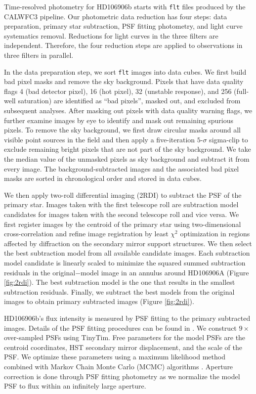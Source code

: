 \documentclass[twocolumn]{aastex62}
\begin{document}
Time-resolved photometry for HD106906b starts with \texttt{flt} files produced by the CALWFC3 pipeline. Our photometric data reduction has four steps: data preparation, primary star subtraction, PSF fitting photometry, and light curve systematics removal. Reductions for light curves in the three filters are independent. Therefore, the four reduction steps are applied to observations in three filters in parallel. 

In the data preparation step, we sort \texttt{flt} images into data cubes. We first build bad pixel masks and remove the sky background. Pixels that have data quality flags 4 (bad detector pixel), 16 (hot pixel), 32 (unstable response), and 256 (full-well saturation) are identified as ``bad pixels'', masked out, and excluded from subsequent analyses. After masking out pixels with data quality warning flags, we further examine images by eye to identify and mask out remaining spurious pixels. To remove the sky background, we first draw circular masks around all visible point sources in the field and then apply a five-iteration $5\mbox{-}\sigma$ sigma-clip to exclude remaining bright pixels that are not part of the sky background. We take the median value of the unmasked pixels as sky background and subtract it from every image. The background-subtracted images and the associated bad pixel masks are sorted in chronological order and stored in data cubes.

We then apply two-roll differential imaging (2RDI) to subtract the PSF of the primary star.  Images taken with the first telescope roll are subtraction model candidates for images taken with the second telescope roll and vice versa. We first register images by the centroid of the primary star using two-dimensional cross-correlation and refine image registration by least $\chi^{2}$ optimization in regions affected by diffraction on the secondary mirror support structures. We then select the best subtraction model from all available candidate images.  Each subtraction model candidate is linearly scaled to minimize the squared summed subtraction residuals in the original$-$model image in an annulus around HD106906A (Figure \ref{fig:2rdi}). The best subtraction model is the one that results in the smallest subtraction residuals. Finally, we subtract the best models from the original images to obtain primary subtracted images (Figure \ref{fig:2rdi}). 

HD106906b's flux intensity is measured by PSF fitting to the primary subtracted images. Details of the PSF fitting procedures can be found in \citet{Zhou2019}. We construct $9\times$ over-sampled PSFs using TinyTim. Free parameters for the model PSFs are the centroid coordinates, HST secondary mirror displacement, and the scale of the PSF. We optimize these parameters using a maximum likelihood method combined with Markov Chain Monte Carlo (MCMC) algorithms \citep[MCMC performed by \texttt{emcee},][]{Foreman-Mackey2012}. Aperture correction is done through PSF fitting photometry as we normalize the model PSF to flux within an infinitely large aperture. 
\end{document}

